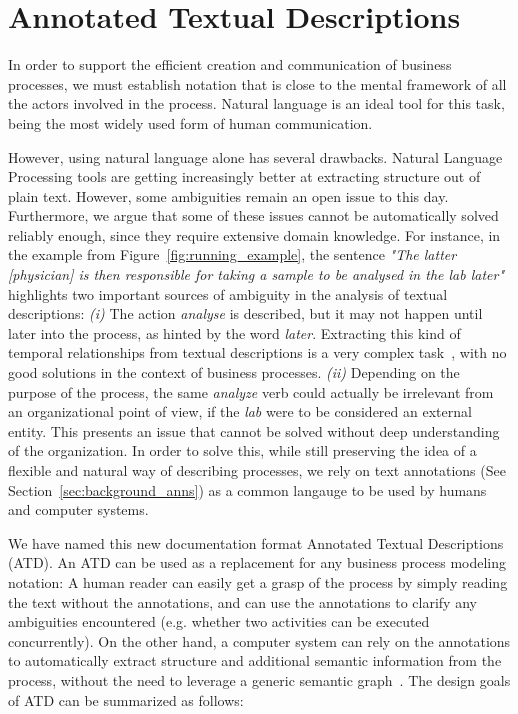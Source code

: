 \section{Annotated Textual Descriptions}
\label{sec:atd_atd}

In order to support the efficient creation and communication of business
processes, we must establish notation that is close to the mental framework of
all the actors involved in the process. Natural language is an ideal tool for
this task, being the most widely used form of human communication.


However, using natural language alone has several drawbacks. Natural Language
Processing tools are getting increasingly better at extracting structure out of
plain text. However, some ambiguities remain an open issue to this day.
Furthermore, we argue that some of these issues cannot be automatically solved
reliably enough, since they require extensive domain knowledge. For instance, in
the example from  Figure~\ref{fig:running_example}, the sentence \emph{"The
  latter [physician] is then responsible for taking a sample to be analysed in
  the lab later"} highlights two important sources of ambiguity in the analysis
of textual descriptions: \emph{(i)} The action \emph{analyse} is described, but
it may not happen until later into the process, as hinted by the word
\emph{later}. Extracting this kind of temporal relationships from textual
descriptions is a very complex task~\cite{Mirza16}, with no good solutions in
the context of business processes. \emph{(ii)} Depending on the purpose of the
process, the same \emph{analyze} verb could actually be irrelevant from an
organizational point of view, if the {\em lab} were to be considered an external
entity. This presents an issue that cannot be solved without deep understanding
of the organization. In order to solve this, while still preserving the idea of
a flexible and natural way of describing processes, we rely on text annotations
(See Section~\ref{sec:background_anns}) as a common langauge to be used by
humans and computer systems.

We have named this new documentation format Annotated Textual Descriptions
(ATD). An ATD can be used as a replacement for any business process modeling
notation: A human reader can easily get a grasp of the process by simply reading
the text without the annotations, and can use the annotations to clarify any
ambiguities encountered (e.g. whether two activities can be executed
concurrently). On the other hand, a computer system can rely on the annotations
to automatically extract structure and additional semantic information from the
process, without the need to leverage a generic semantic graph~\cite{PadroS12}.
The design goals of ATD can be summarized as follows:


